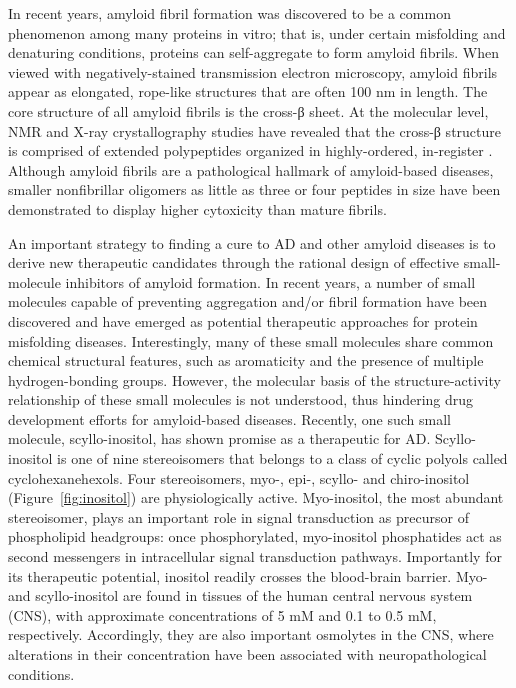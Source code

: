 In recent years, amyloid fibril formation was discovered to be a common phenomenon among many proteins in vitro; that is, under certain misfolding and denaturing conditions, proteins can self-aggregate to form amyloid fibrils.\cite{Chiti:2006p20} When viewed with negatively-stained transmission electron microscopy, amyloid fibrils appear as elongated, rope-like structures that are often 100 nm in length.\cite{Chiti:2006p20} The core structure of all amyloid fibrils is the cross-β sheet.\cite{Chiti:2006p20,Serpell:2000p39} At the molecular level, NMR\cite{Balbach:2000p49,Petkova:2006p48} and X-ray crystallography\cite{Sawaya:2007p11} studies have revealed that the cross-β structure is comprised of extended polypeptides organized in highly-ordered, in-register \bsheets. Although amyloid fibrils are a pathological hallmark of amyloid-based diseases, smaller nonfibrillar oligomers as little as three or four peptides in size have been demonstrated to display higher cytoxicity than mature fibrils.\cite{Gong:2003p22,Bitan:2003p10,Caughey:2009p5,Keshet:2010p61,Kitamura:2010p6,Lambert:1998p60,Selkoe:2008p16}

An important strategy to finding a cure to AD and other amyloid diseases is to derive new therapeutic candidates through the rational design of effective small-molecule inhibitors of amyloid formation. In recent years, a number of small molecules capable of preventing aggregation and/or fibril formation have been discovered and have emerged as potential therapeutic approaches for protein misfolding diseases.\cite{Frid:2007p65,Hawkes:2009p9,LeVine:2009p38,Necula:2007p42,ScherzerAttali:2010p63,Sood:2009p14} Interestingly, many of these small molecules share common chemical structural features, such as aromaticity and the presence of multiple hydrogen-bonding groups.\cite{Ehrnhoefer:2008p8,Liu:2009p18,Liu:2005p7,Porat:2006p33} However, the molecular basis of the structure-activity relationship of these small molecules is not understood, thus hindering drug development efforts for amyloid-based diseases. 
Recently, one such small molecule, scyllo-inositol, has shown promise as a therapeutic for AD.\cite{McLaurin:2006p29,McLaurin:2000p64} Scyllo-inositol is one of nine stereoisomers that belongs to a class of cyclic polyols called cyclohexanehexols. Four stereoisomers, myo-, epi-, scyllo- and chiro-inositol (Figure~\ref{fig:inositol}) are physiologically active.\cite{Fisher:2002p62} Myo-inositol, the most abundant stereoisomer, plays an important role in signal transduction as precursor of phospholipid headgroups: once phosphorylated, myo-inositol phosphatides act as second messengers in intracellular signal transduction pathways.\cite{Fisher:2002p62} Importantly for its therapeutic potential, inositol readily crosses the blood-brain barrier. Myo- and scyllo-inositol are found in tissues of the human central nervous system (CNS), with approximate concentrations of 5 mM and 0.1 to 0.5 mM, respectively.\cite{Michaelis:1993p89} Accordingly, they are also important osmolytes in the CNS, where alterations in their concentration have been associated with neuropathological conditions.\cite{Fisher:2002p62,Michell:2008p4}
 
